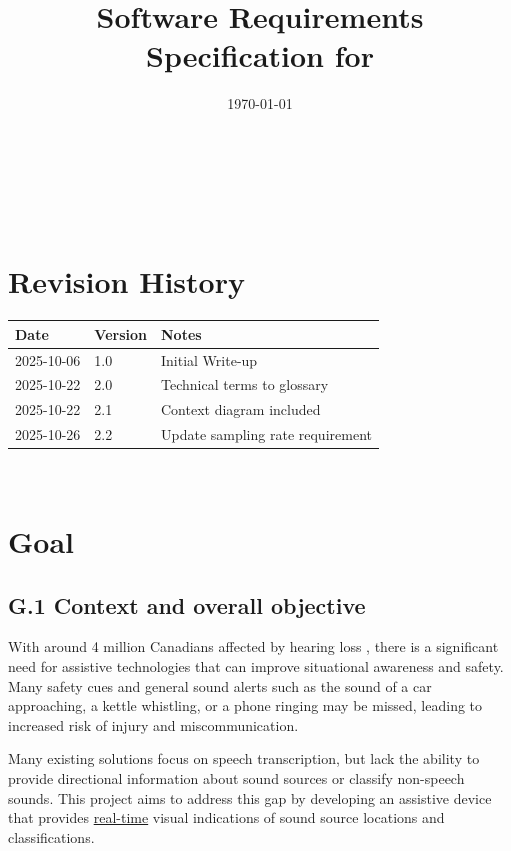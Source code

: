 \documentclass[12pt]{article}
\theoremstyle{definition}
\begin{document}
\title{Software Requirements Specification for \progname} 
\author{\authname}
\date{\today}
	
\maketitle

~\newpage


\tableofcontents

~\newpage

\section*{Revision History}


\begin{tabularx}{\textwidth}{p{3cm}p{2cm}X} \toprule {\bf Date} & {\bf Version}
& {\bf Notes}\\
\midrule
2025-10-06 & 1.0 & Initial Write-up\\
2025-10-22 & 2.0 & Technical terms to glossary\\
2025-10-22 & 2.1 & Context diagram included\\
2025-10-26 & 2.2 & Update sampling rate requirement\\
\bottomrule
\end{tabularx}


~\newpage


\section{Goal}

\subsection{G.1 Context and overall objective}

With around 4 million Canadians affected by hearing loss \cite{Healthing2025}, 
there is a significant need for assistive technologies that can improve 
situational awareness and safety. Many safety cues and general sound alerts such
as the sound of a car approaching, a kettle whistling, or a phone ringing may be
missed, leading to increased risk of injury and miscommunication.

Many existing solutions focus on speech transcription, but lack the ability to
provide directional information about sound sources or classify non-speech
sounds. This project aims to address this gap by developing an assistive device
that provides \hyperref[def:real_time]{real-time} visual indications of sound
source locations and classifications.
\end{document}
